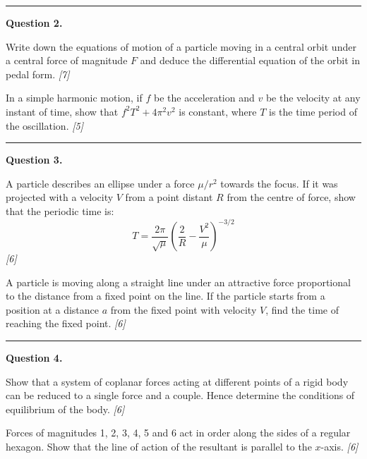 \documentclass[11pt,a4paper]{article}
\newcommand{\pts}[1]{\hfill   \textit{[#1]}}
\begin{document}
\medskip\rule{\linewidth}{0.2pt}

\medskip


\noindent   \textbf{Question 2.}

\begin{parts}
  \item Write down the equations of motion of a particle moving in a central orbit under a central force of magnitude $F$ and deduce the differential equation of the orbit in pedal form. \pts{7}
  \item In a simple harmonic motion, if $f$ be the acceleration and $v$ be the velocity at any instant of time, show that $f^2 T^2 + 4\pi^2 v^2$ is constant, where $T$ is the time period of the oscillation. \pts{5}
\end{parts}

\medskip\rule{\linewidth}{0.2pt}

\medskip


\noindent   \textbf{Question 3.}

\begin{parts}
  \item A particle describes an ellipse under a force $\mu/r^2$ towards the focus. If it was projected with a velocity $V$ from a point distant $R$ from the centre of force, show that the periodic time is:
  \[
  T = \frac{2\pi}{\sqrt{\mu}} \left( \frac{2}{R} - \frac{V^2}{\mu} \right)^{-3/2}
  \] \pts{6}
  \item A particle is moving along a straight line under an attractive force proportional to the distance from a fixed point on the line. If the particle starts from a position at a distance $a$ from the fixed point with velocity $V$, find the time of reaching the fixed point. \pts{6}
\end{parts}

\medskip\rule{\linewidth}{0.2pt}

\medskip


\noindent   \textbf{Question 4.}

\begin{parts}
  \item Show that a system of coplanar forces acting at different points of a rigid body can be reduced to a single force and a couple. Hence determine the conditions of equilibrium of the body. \pts{6}
  \item Forces of magnitudes 1, 2, 3, 4, 5 and 6 act in order along the sides of a regular hexagon. Show that the line of action of the resultant is parallel to the $x$-axis. \pts{6}
\end{parts}
\end{document}
